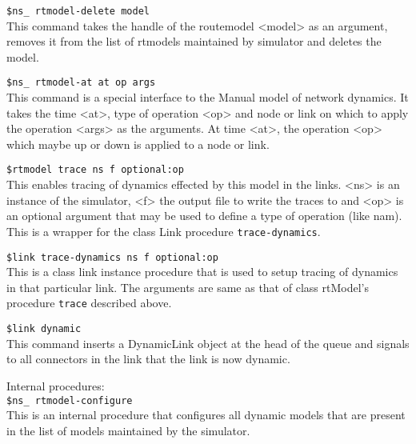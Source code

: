 \begin{flushleft}
{\tt \$ns\_ rtmodel-delete \<model\>}\\
This command takes the handle of the routemodel <model> as an argument,
removes  it from the list of rtmodels maintained by simulator and deletes
the model.


{\tt \$ns\_ rtmodel-at  \<at\> \<op\> \<args\>}\\
This command is a special interface to the Manual model of network dynamics.
It takes the time <at>, type of operation <op> and node or link on which
to apply the operation <args> as the arguments. At time <at>, the operation <op>
which maybe up or down is applied to a node or link.

{\tt \$rtmodel trace \<ns\> \<f\> \<optional:op\>}\\
This enables tracing of dynamics effected by this model in the links. <ns>
is an instance of the simulator, <f> the output file to write the traces to
and <op> is an optional argument that may be used to define a type of
operation (like nam). This is a wrapper for the class Link procedure
{\tt trace-dynamics}.


{\tt \$link trace-dynamics \<ns\> \<f\> \<optional:op\>}\\
This is a class link instance procedure that is used to setup tracing of
dynamics in that particular link. The arguments are same as that of class
rtModel's procedure {\tt trace} described above.


{\tt \$link dynamic}\\
This command inserts a DynamicLink object at the head of the queue and signals
to all connectors in the link that the link is now dynamic.


Internal procedures:\\

{\tt \$ns\_ rtmodel-configure}\\
This is an internal procedure that configures all dynamic models that are
present in the list of models maintained by the simulator.

\end{flushleft}

\endinput

### Local Variables:
### mode: latex
### comment-column: 60
### backup-by-copying-when-linked: t
### file-precious-flag: nil
### End:
